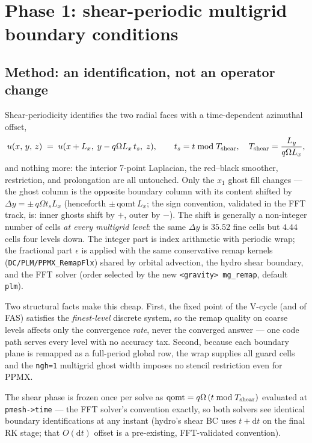 \documentclass[11pt]{article}
\newcommand{\code}[1]{\texttt{#1}}
\begin{document}
\section{Phase 1: shear-periodic multigrid boundary conditions}
\label{sec:phase1}

\subsection{Method: an identification, not an operator change}
\label{sec:p1_method}
Shear-periodicity identifies the two radial faces with a time-dependent azimuthal
offset,
\begin{equation}
  u(x,\,y,\,z) \;=\; u(x + L_x,\; y - q\Omega L_x\, t_s,\; z),
  \qquad t_s = t \bmod T_{\rm shear},\quad
  T_{\rm shear} = \frac{L_y}{q\Omega L_x},
\label{eq:shear_ident}
\end{equation}
and nothing more: the interior 7-point Laplacian, the red--black smoother,
restriction, and prolongation are all untouched. Only the $x_1$ ghost fill changes
--- the ghost column is the opposite boundary column with its content shifted by
$\Delta y = \pm\, q\Omega t_s L_x$ (henceforth $\pm\,\mathrm{qomt}\,L_x$; the sign
convention, validated in the FFT track, is: inner ghosts shift by $+$, outer by
$-$). The shift is generally a non-integer number of cells \emph{at every multigrid
level}: the same $\Delta y$ is $35.52$ fine cells but $4.44$ cells four levels down.
The integer part is index arithmetic with periodic wrap; the fractional part
$\epsilon$ is applied with the same conservative remap kernels
(\code{DC/PLM/PPMX\_RemapFlx}) shared by orbital advection, the hydro shear
boundary, and the FFT solver (order selected by the new \code{<gravity> mg\_remap},
default \code{plm}).

Two structural facts make this cheap. First, the fixed point of the V-cycle (and of
FAS) satisfies the \emph{finest-level} discrete system, so the remap quality on
coarse levels affects only the convergence \emph{rate}, never the converged answer
--- one code path serves every level with no accuracy tax. Second, because each
boundary plane is remapped as a full-period global row, the wrap supplies all guard
cells and the \code{ngh=1} multigrid ghost width imposes no stencil restriction even
for PPMX.

The shear phase is frozen once per solve as
$\mathrm{qomt} = q\Omega\,(t \bmod T_{\rm shear})$ evaluated at \code{pmesh->time} ---
the FFT solver's convention exactly, so both solvers see identical boundary
identifications at any instant (hydro's shear BC uses $t+\mathrm{d}t$ on the final RK
stage; that $O(\mathrm{d}t)$ offset is a pre-existing, FFT-validated convention).
\end{document}
